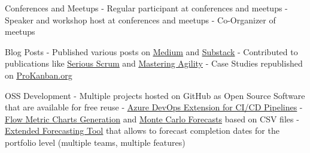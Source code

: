 {
}

\begin{cvskills}
	\cvskill
	{
		{Conferences and Meetups}
	} %
	{
				{- Regular participant at conferences and meetups \linebreak
				- Speaker and workshop host at conferences and meetups \linebreak
				- Co-Organizer of meetups \linebreak }
	}
	
	\cvskill
	{
		{Blog Posts}
	} %
	{
		{	- Published various posts on \underline{\href{https://medium.com/@benjihuser}{Medium}} and \underline{\href{https://substack.com/@huserben}{Substack}} \linebreak
			- Contributed to publications like \underline{\href{https://medium.com/serious-scrum}{Serious Scrum}} and \underline{\href{https://medium.com/mastering-agility}{Mastering Agility}} \linebreak
			- Case Studies republished on \underline{\href{https://www.prokanban.org/blog/https-prokanban-org-blog-monte-carlo-simulations-accuracy-and-unplanned-work-a-case-study}{ProKanban.org}} 
		}
	}
	
	\cvskill
	{
		{OSS Development}
	} %
	{
		{\linebreak}
		{	- Multiple projects hosted on GitHub as Open Source Software that are available for free reuse \linebreak
			- \underline{ \href{https://marketplace.visualstudio.com/items?itemName=benjhuser.tfs-extensions-build-tasks}{Azure DevOps Extension for CI/CD Pipelines}} \linebreak
			- \underline{\href{https://www.letpeople.work/flowmetricscsv}{Flow Metric Charts Generation}} and \underline{\href{https://www.letpeople.work/montecarlocsv}{Monte Carlo Forecasts}} based on CSV files \linebreak
			- \underline{\href{https://www.letpeople.work/lighthouse}{Extended Forecasting Tool}} that allows to forecast completion dates for the portfolio level (multiple teams, multiple features)
			}
	} %
\end{cvskills}
